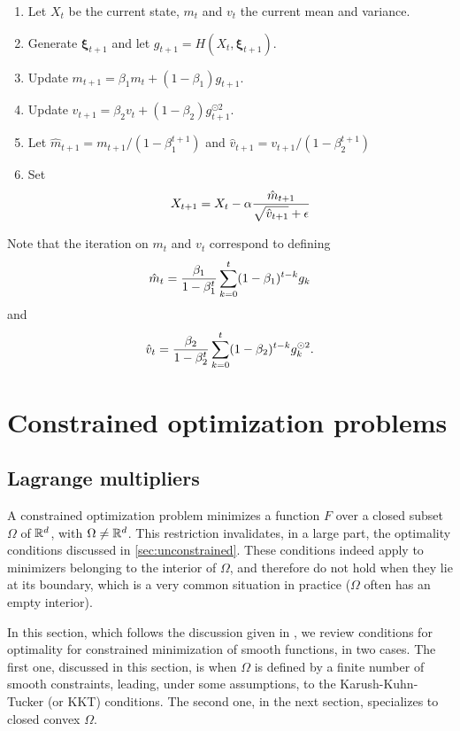 \begin{algorithm}[ADAM]
\label{alg:adam}
\begin{enumerate}[label=\arabic*., wide=0.5cm]
\item Let $X_t$ be the current state, $m_t$ and $v_t$ the current mean and variance.
\item Generate $\boldsymbol\xi_{t+1}$ and let $g_{t+1} = H(X_t, \boldsymbol\xi_{t+1})$.
\item Update $m_{t+1} = \beta_1 m_t + (1-\beta_1) g_{t+1}$.
\item Update $v_{t+1} = \beta_2 v_t + (1-\beta_2) g^{\odot 2}_{t+1}$.
\item Let $\hat m_{t+1} = m_{t+1} / (1-\beta_1^{t+1})$ and $\hat v_{t+1} = v_{t+1} / (1-\beta_2^{t+1})$
\item
Set 
\[
X_{t+1}  = X_t - \alpha \frac{\hat m_{t+1}}{\sqrt{\hat v_{t+1}} + \epsilon}
\]
\end{enumerate}
\end{algorithm}
Note that the iteration on $m_t$ and $v_{t}$ correspond to defining 
\[ 
\hat m_t = \frac{\beta_1}{1 - \beta_1^t} \sum_{k=0}^t (1 - \beta_1)^{t-k} g_k
\]
and   
\[
\hat v_t = \frac{\beta_2}{1 - \beta_2^t} \sum_{k=0}^t (1 - \beta_2)^{t-k} g_k^{\odot 2}.
\]



\section{Constrained optimization problems}

\subsection{Lagrange multipliers}
A constrained optimization problem minimizes a function $F$ over a closed subset $\Omega$ of ${\mathbb{R}}^d$, with $\Omega \neq {\mathbb{R}}^d$. This restriction invalidates, in a large part, the optimality conditions discussed in \cref{sec:unconstrained}. These conditions indeed apply to minimizers belonging to the interior of $\Omega$, and therefore do not hold when they lie at its boundary, which is a very common situation in practice ($\Omega$  often has an empty interior).

In this section, which follows the discussion given in \citet{wright2022optimization}, we review conditions for optimality for constrained minimization of smooth functions, in two cases. The first one, discussed in this section, is when $\Omega$ is defined by a finite number of smooth constraints, leading, under some assumptions, to the Karush-Kuhn-Tucker (or KKT) conditions. The second one, in the next section, specializes to closed convex $\Omega$.

